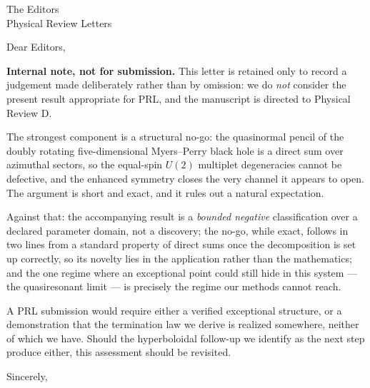 \documentclass[11pt]{letter}
\begin{document}
\begin{letter}{The Editors\\ Physical Review Letters}
\opening{Dear Editors,}

\textbf{Internal note, not for submission.} This letter is retained only to
record a judgement made deliberately rather than by omission: we do \emph{not}
consider the present result appropriate for PRL, and the manuscript is directed
to Physical Review D.

The strongest component is a structural no-go: the quasinormal pencil of the
doubly rotating five-dimensional Myers--Perry black hole is a direct sum over
azimuthal sectors, so the equal-spin $U(2)$ multiplet degeneracies cannot be
defective, and the enhanced symmetry closes the very channel it appears to open.
The argument is short and exact, and it rules out a natural expectation.

Against that: the accompanying result is a \emph{bounded negative}
classification over a declared parameter domain, not a discovery; the no-go,
while exact, follows in two lines from a standard property of direct sums once
the decomposition is set up correctly, so its novelty lies in the application
rather than the mathematics; and the one regime where an exceptional point could
still hide in this system --- the quasiresonant limit --- is precisely the
regime our methods cannot reach.

A PRL submission would require either a verified exceptional structure, or a
demonstration that the termination law we derive is realized somewhere, neither
of which we have. Should the hyperboloidal follow-up we identify as the next
step produce either, this assessment should be revisited.

\closing{Sincerely,}
\end{letter}
\end{document}
